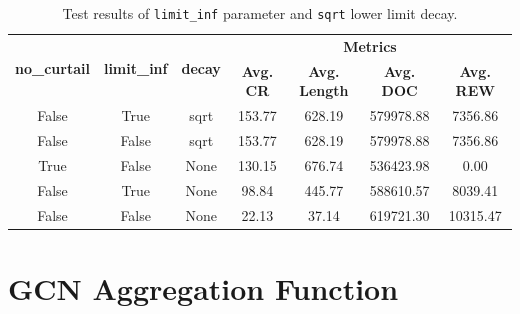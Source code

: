 \begin{table}[H]
	\centering
	\caption{Test results of \texttt{limit\_inf} parameter and \texttt{sqrt} lower limit decay.}
	\begin{tabular}{ccccccc}
		\toprule
		\multirow{2}{*}{\textbf{no\_curtail}} & \multirow{2}{*}{\textbf{limit\_inf}} & \multirow{2}{*}{\textbf{decay}} & \multicolumn{4}{c}{\textbf{Metrics}} \\ 
		\cmidrule(lr){4-7}
		&  & & \textbf{Avg. CR} & \textbf{Avg. Length} & \textbf{Avg. DOC} & \textbf{Avg. REW} \\ 
		\midrule
		False & True & sqrt & 153.77 & 628.19 & 579978.88 & 7356.86 \\
		False & False & sqrt & 153.77 & 628.19 & 579978.88 & 7356.86 \\
		True & False & None & 130.15 & 676.74 & 536423.98 & 0.00 \\
		False & True & None & 98.84 & 445.77 & 588610.57 & 8039.41 \\
		False & False & None &  22.13 & 37.14 & 619721.30 & 10315.47 \\
		
		\bottomrule
	\end{tabular}
	\label{tab:test-action2}
\end{table}

\section{\ac{GCN} Aggregation Function}

